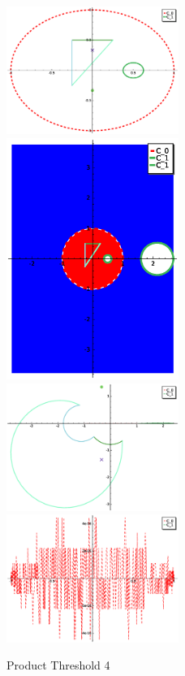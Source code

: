 \documentclass[a4paper,10pt]{article}
\begin{document}
\graphicspath{{./GE2LE1PT4/}}
\begin{figure}
\caption{Product Threshold 4}
\includegraphics[width=0.5\textwidth]{circle_plot.eps}
\includegraphics[width=0.5\textwidth]{Fundamental_domain.eps}
\includegraphics[width=0.5\textwidth]{zedplot.eps}
\includegraphics[width=0.5\textwidth]{zedplot_C0.eps}
\end{figure}
\end{document}
